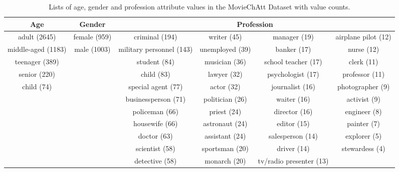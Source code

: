 

\begin{table}[ht!]\sffamily
\centering
\begin{adjustbox}{width=0.95\textwidth}
\begin{tabular}{cccccc}
\textbf{Age}       & \textbf{Gender}          & \multicolumn{4}{c}{\textbf{Profession}}  \\ \toprule
adult (2645)       & female (959) & criminal (194)           & writer (45)     & manager (19)            & airplane pilot (12) \\
middle-aged (1183) & male (1003)  & military personnel (143) & unemployed (39) & banker (17)             & nurse (12)          \\
teenager (389)     &          & student (84)             & musician (36)   & school teacher (17)     & clerk (11)          \\
senior (220)       &          & child (83)               & lawyer (32)     & psychologist (17)       & professor (11)      \\
child (74)         &          & special agent (77)       & actor (32)      & journalist (16)         & photographer (9)    \\
                   &          & businessperson (71)      & politician (26) & waiter (16)             & activist (9)        \\
                   &          & policeman (66)           & priest (24)     & director (16)           & engineer (8)        \\
                   &          & housewife (66)           & astronaut (24)  & editor (15)             & painter (7)         \\
                   &          & doctor (63)              & assistant (24)  & salesperson (14)        & explorer (5)        \\
                   &          & scientist (58)           & sportsman (20)  & driver (14)             & stewardess (4)      \\
                   &          & detective (58)           & monarch (20)    & tv/radio presenter (13) &  
\end{tabular}
\end{adjustbox}
\caption{Lists of age, gender and profession attribute values in the MovieChAtt Dataset with value counts.}
\label{moviechatt}
\end{table}

